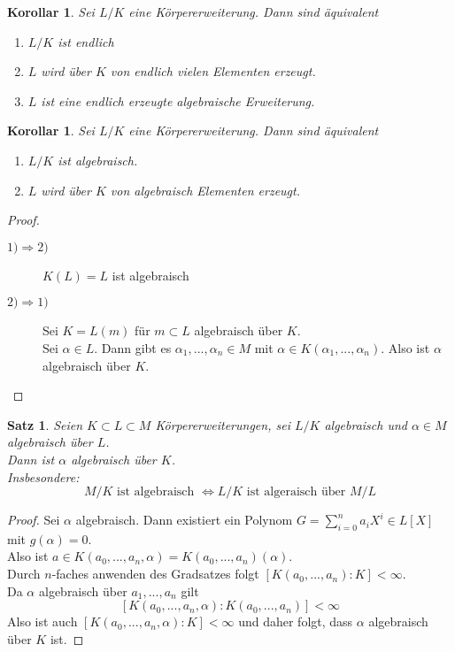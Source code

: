 \documentclass[10pt,a4paper]{article}
\newcommand{\al}{\ensuremath{\alpha}}
\theoremstyle{plain}
\newtheorem{kor}[theorem]{Korollar}
\newtheorem{satz}[theorem]{Satz}
\theoremstyle{definition}
\theoremstyle{remark}
\begin{document}
	\begin{kor}
		Sei $L/K$ eine Körpererweiterung. Dann sind äquivalent
		\begin{enumerate}
			\item $L/K$ ist endlich
			\item $L$ wird über $K$ von endlich vielen Elementen erzeugt.
			\item $L$ ist eine endlich erzeugte algebraische Erweiterung.
		\end{enumerate}
	\end{kor}

	\begin{kor}
		Sei $L/K$ eine Körpererweiterung. Dann sind äquivalent
		\begin{enumerate}
			\item $L/K$ ist algebraisch.
			\item $L$ wird über $K$ von algebraisch Elementen erzeugt.
		\end{enumerate}
	\end{kor}
	\begin{proof}
		\begin{description}
			\item[$1)\Rightarrow2)$] $K(L)=L$ ist algebraisch
			\item[$2)\Rightarrow1)$] Sei $K=L(m)$ für $ m\subset L$ algebraisch über $K$.\\
			Sei $\al\in L$. Dann gibt es $\al_1,...,\al_n\in M$ mit $\al\in K(\al_1,...,\al_n)$. Also ist $\al$ algebraisch über $K$.
		\end{description}
	\end{proof}

	\begin{satz}
		Seien $K\subset L\subset M$ Körpererweiterungen, sei $L/K$ algebraisch und $\al\in M$ algebraisch über $L$.\\
		Dann ist $\al$ algebraisch über $K$.\\
		Insbesondere:
		\[\text{$M/K$ ist algebraisch }\Leftrightarrow\text{$L/K$ ist algeraisch über $M/L$}\]
	\end{satz}
	\begin{proof}
		Sei $\al$ algebraisch.  Dann existiert ein Polynom $G=\sum_{i=0}^{n}a_iX^i\in L[X]$ mit $g(\al)=0$.\\
		Also ist $a\in K(a_0,...,a_n,\al)=K(a_0,...,a_n)(\al)$.\\
		Durch $n$-faches anwenden des Gradsatzes folgt $[K(a_0,...,a_n):K]<\infty$.\\
		Da $\al$ algebraisch über $a_1,...,a_n$  gilt
		\[[K(a_0,...,a_n,\al):K(a_0,...,a_n)]<\infty\]
		Also ist auch $[K(a_0,...,a_n,\al):K]<\infty$ und daher folgt, dass $\al$ algebraisch über $K$ ist.
	\end{proof}
	
\end{document}
